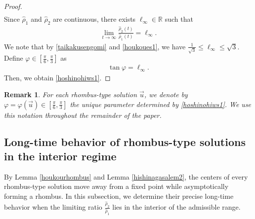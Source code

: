 \documentclass[10pt,a4paper]{amsart}
\newtheorem{remark}{Remark}[section]
\numberwithin{equation}{section}
\begin{document}
\begin{proof}
\begin{align*}
\end{align*}
Since $\hat{\rho}_1$ and $\hat{\rho}_2$ are continuous, there exists $\ell_{\infty}\in \mathbb{R}$ such that 
\begin{align}
\lim_{t\to\infty}\frac{\hat{\rho}_2(t)}{\hat{\rho}_1(t)}=\ell_{\infty}.
\end{align}
We note that by \eqref{taikakusengomi} and \eqref{houkoues1}, we have $\frac{1}{\sqrt{3}}\leq \ell_{\infty}\leq \sqrt{3}$. Define $\varphi\in[\frac{\pi}{6},\frac{\pi}{3}]$ as
\begin{align*}
\tan{\varphi}=\ell_{\infty}.
\end{align*}
Then, we obtain \eqref{hoshinohiws1}.
\end{proof}

\begin{remark}
For each rhombus-type solution $\vec{u}$, we denote by $\varphi=\varphi(\vec{u})\in[\frac{\pi}{6},\frac{\pi}{3}]$
the unique parameter determined by \eqref{hoshinohiws1}. We use this notation throughout the remainder of the paper.
\end{remark}

\subsection{Long-time behavior of rhombus-type solutions in the interior regime}

By Lemma \ref{houkourhombus} and Lemma \ref{hishinagasalem2}, the centers of every rhombus-type solution move away from a fixed point while asymptotically forming a rhombus. In this subsection, we determine their precise long-time behavior when the limiting ratio $\frac{\hat{\rho}_2}{\hat{\rho}_1}$ lies in the interior of the admissible range.
\end{document}
